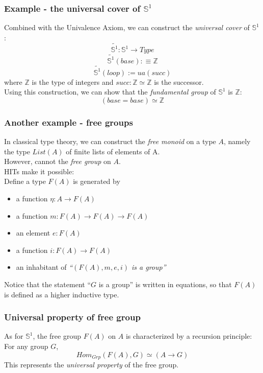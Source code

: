 \documentclass[dvipdfmx]{beamer}
\begin{document}
\begin{frame}
  \frametitle{Example - the universal cover of ${\mathbb S}^1$}
  Combined with the Univalence Axiom,
  we can construct the {\it universal cover} of ${\mathbb S}^1$:
  \[
    \widetilde{ {\mathbb S}^1 } : {\mathbb S}^1 \to Type
  \]
  \[
    \widetilde{ {\mathbb S}^1 } \left( base \right) :\equiv {\mathbb Z}
  \]
  \[
    \widetilde{ {\mathbb S}^1 } \left( loop \right) := ua \left( succ \right)
  \]
  where ${\mathbb Z}$ is the type of integers
  and $succ : {\mathbb Z} \simeq {\mathbb Z}$ is the successor.
  \pause
  \\
  Using this construction, we can show that
  the {\it fundamental group} of ${\mathbb S}^1$ is ${\mathbb Z}$:
  \[
    \left( base = base \right) \simeq {\mathbb Z}
  \]
\end{frame}

\begin{frame}
  \frametitle{Another example - free groups}
  In classical type theory,
  we can construct the {\it free monoid} on a type $A$,
  namely the type $List \left( A \right)$ of finite lists
  of elements of A.
  \pause
  \\
  However, cannot the {\it free group} on $A$.
  \pause
  \\
  HITs make it possible:
  \\
  Define a type $F \left( A \right)$ is generated by
  \begin{itemize}
      \pause
    \item a function $\eta : A \to F \left( A \right)$
    \item a function $m : F \left( A \right) \to
      F \left( A \right) \to F \left( A \right)$
    \item an element $e : F \left( A \right)$
    \item a function $i : F \left( A \right) \to F \left( A \right)$
      \pause
    \item an inhabitant of
      {\it ``$\left( F \left( A \right) , m , e , i \right)$ is a group''}
  \end{itemize}
  \pause
  Notice that the statement ``$G$ is a group''
  is written in equations, so that
  $F \left( A \right)$ is defined as a higher inductive type.
\end{frame}

\begin{frame}
  \frametitle{Universal property of free group}
  As for ${\mathbb S}^1$,
  the free group $F \left( A \right)$ on $A$
  is characterized by a recursion principle:
  \\
  For any group $G$,
  \[
    Hom_{Grp} \left( F \left( A \right) , G \right)
    \simeq
    \left( A \to G \right)
  \]
  This represents the {\it universal property}
  of the free group.
\end{frame}
\end{document}

